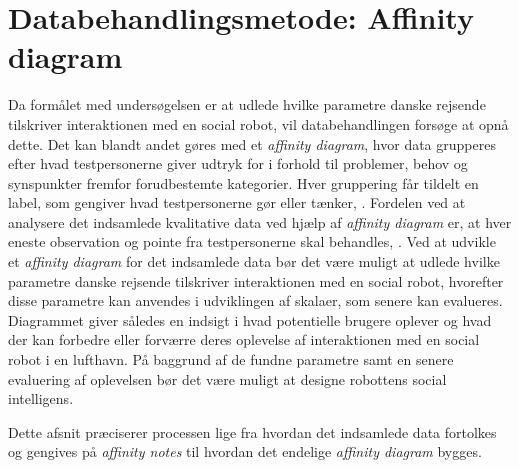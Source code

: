\section{Databehandlingsmetode: Affinity diagram}
\label{ParametreMetodeovervejelserAffinityDiagram}
%
Da formålet med undersøgelsen er at udlede hvilke parametre danske rejsende tilskriver interaktionen med en social robot, vil databehandlingen forsøge at opnå dette. Det kan blandt andet gøres med et \textit{affinity diagram}, hvor data grupperes efter hvad testpersonerne giver udtryk for i forhold til problemer, behov og synspunkter fremfor forudbestemte kategorier. Hver gruppering får tildelt en label, som gengiver hvad testpersonerne gør eller tænker, \parencite[s. 159]{Book:BuildingAnAffinity}. Fordelen ved at analysere det indsamlede kvalitative data ved hjælp af \textit{affinity diagram} er, at hver eneste observation og pointe fra testpersonerne skal behandles, \parencite[s. 25]{PDF:ConsolidationIdeationAffinity}. Ved at udvikle et \textit{affinity diagram} for det indsamlede data bør det være muligt at udlede hvilke parametre danske rejsende tilskriver interaktionen med en social robot, hvorefter disse parametre kan anvendes i udviklingen af skalaer, som senere kan evalueres. Diagrammet giver således en indsigt i hvad potentielle brugere oplever og hvad der kan forbedre eller forværre deres oplevelse af interaktionen med en social robot i en lufthavn. På baggrund af de fundne parametre samt en senere evaluering af oplevelsen bør det være muligt at designe robottens social intelligens.   

Dette afsnit præciserer processen lige fra hvordan det indsamlede data fortolkes og gengives på \textit{affinity notes} til hvordan det endelige \textit{affinity diagram} bygges.

